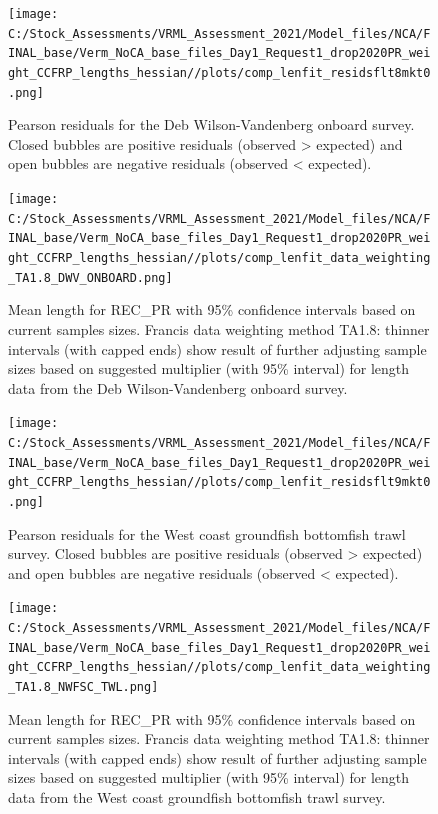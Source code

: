 \documentclass[
  english,
  a4paper,
]{article}
\begin{document}
\begin{figure}
\centering
\texttt{[image: C:/Stock\_Assessments/VRML\_Assessment\_2021/Model\_files/NCA/FINAL\_base/Verm\_NoCA\_base\_files\_Day1\_Request1\_drop2020PR\_weight\_CCFRP\_lengths\_hessian//plots/comp\_lenfit\_residsflt8mkt0.png]}
\caption{Pearson residuals for the Deb Wilson-Vandenberg onboard survey. Closed bubbles are positive residuals (observed \textgreater{} expected) and open bubbles are negative residuals (observed \textless{} expected).\label{fig:len-pearson-DWV-ONBOARD}}
\end{figure}

\begin{figure}
\centering
\texttt{[image: C:/Stock\_Assessments/VRML\_Assessment\_2021/Model\_files/NCA/FINAL\_base/Verm\_NoCA\_base\_files\_Day1\_Request1\_drop2020PR\_weight\_CCFRP\_lengths\_hessian//plots/comp\_lenfit\_data\_weighting\_TA1.8\_DWV\_ONBOARD.png]}
\caption{Mean length for REC\_PR with 95\% confidence intervals based on current samples sizes. Francis data weighting method TA1.8: thinner intervals (with capped ends) show result of further adjusting sample sizes based on suggested multiplier (with 95\% interval) for length data from the Deb Wilson-Vandenberg onboard survey.\label{fig:mean-len-fit-DWV-ONBOARD}}
\end{figure}

\begin{figure}
\centering
\texttt{[image: C:/Stock\_Assessments/VRML\_Assessment\_2021/Model\_files/NCA/FINAL\_base/Verm\_NoCA\_base\_files\_Day1\_Request1\_drop2020PR\_weight\_CCFRP\_lengths\_hessian//plots/comp\_lenfit\_residsflt9mkt0.png]}
\caption{Pearson residuals for the West coast groundfish bottomfish trawl survey. Closed bubbles are positive residuals (observed \textgreater{} expected) and open bubbles are negative residuals (observed \textless{} expected).\label{fig:len-pearson-NWFSC-TWL}}
\end{figure}

\begin{figure}
\centering
\texttt{[image: C:/Stock\_Assessments/VRML\_Assessment\_2021/Model\_files/NCA/FINAL\_base/Verm\_NoCA\_base\_files\_Day1\_Request1\_drop2020PR\_weight\_CCFRP\_lengths\_hessian//plots/comp\_lenfit\_data\_weighting\_TA1.8\_NWFSC\_TWL.png]}
\caption{Mean length for REC\_PR with 95\% confidence intervals based on current samples sizes. Francis data weighting method TA1.8: thinner intervals (with capped ends) show result of further adjusting sample sizes based on suggested multiplier (with 95\% interval) for length data from the West coast groundfish bottomfish trawl survey.\label{fig:mean-len-fit-NWFSC-TWL}}
\end{figure}
\end{document}
